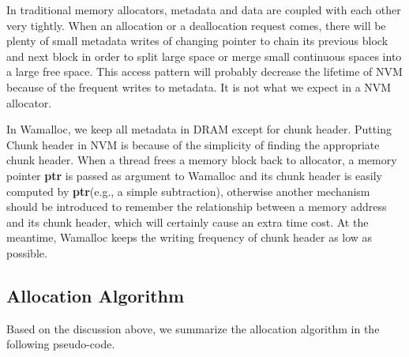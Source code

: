 \documentclass[10pt, conference, compsocconf]{IEEEtran}
\begin{document}
In traditional memory allocators, metadata and data are coupled with each other very tightly.
When an allocation or a deallocation request comes, 
there will be plenty of small metadata writes of changing pointer to chain its previous block and next block 
in order to split large space or merge small continuous spaces into a large free space.
This access pattern will probably decrease the lifetime of NVM because of the frequent writes to metadata.
It is not what we expect in a NVM allocator.

In Wamalloc, we keep all metadata in DRAM except for chunk header. 
Putting Chunk header in NVM is because of the simplicity of finding the appropriate chunk header.
When a thread frees a memory block back to allocator, 
a memory pointer \textbf{ptr} is passed as argument to Wamalloc and 
its chunk header is easily computed by \textbf{ptr}(e.g., a simple subtraction),
otherwise another mechanism should be introduced to 
remember the relationship between a memory address and its chunk header,
which will certainly cause an extra time cost.
At the meantime, Wamalloc keeps the writing frequency of chunk header as low as possible. 

\subsection{Allocation Algorithm}

Based on the discussion above, we summarize the allocation algorithm in the following pseudo-code.
\end{document}
